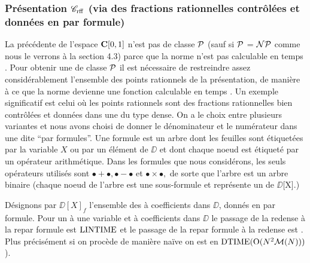 \subsubsection{Présentation \texorpdfstring{${{{\mathscr C}}_{\rm rff}}$}{Cfrac}
(via des fractions rationnelles contrôlées et données en \pres par formule)} \label{fsubsubsec322}
La \pres précédente de l'espace  ${{\bf C}[0,1]}$  n'est pas de 
classe  ${\cal P}$  (sauf si ${\cal P}$ = ${\cal NP}$ comme nous le verrons à la section 4.3)  parce que la norme n'est pas calculable en temps \poll.  
Pour obtenir une \pres de classe ${\cal P}$ il est nécessaire de restreindre assez considérablement l'ensemble des points rationnels de la présentation, de manière à ce que la norme devienne une fonction calculable en temps \poll. 
Un exemple significatif est celui où les points rationnels sont des fractions rationnelles bien contrôlées et données dans une \pres du 
type dense.
On a le choix entre plusieurs variantes et nous avons choisi de donner le 
dénominateur et le numérateur dans une \pres dite ``par formules''.  Une 
formule est un arbre dont les feuilles sont étiquetées par la variable $X$ 
ou par un élément de  $\DD$  et dont chaque noeud est étiqueté par un 
opérateur arithmétique.  
Dans les formules que nous considérons, les seuls opérateurs utilisés  sont $\bullet + \bullet, \bullet - \bullet$ et $\bullet \times  \bullet,$ de sorte que l'arbre est un arbre binaire (chaque noeud de l'arbre est une sous-formule et représente un \pol de $\DD$[X].) 



\begin{flemma} 
\label{f324} Désignons par $\DD[X]_f$  l'ensemble des \pols à 
coefficients dans $\DD$, donnés en \pres par formule.  Pour un \pol à 
une variable et à coefficients dans  $\DD$   le passage de la re\pres dense 
à la re\pres par formule est  ${\rm LINTIME} $  et le passage de la re\pres par 
formule à la re\pres dense est \poll. Plus précisément si on 
procède de manière naïve on est en  ${\rm DTIME} ({\rm O}(N^2{\cal M}(N)))$).
\end{flemma}

